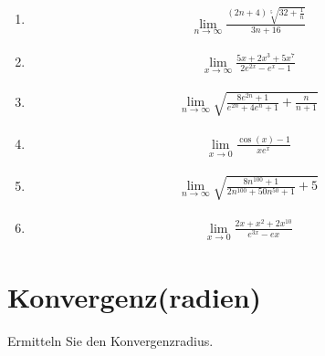 \documentclass{article}
\begin{document}
\begin{multicols}{2}
\begin{enumerate}
    \item \begin{align*}
        \lim_{n \to \infty} \frac{(2n + 4)\sqrt[5]{32 + \frac{1}{n}}}{3n + 16}
    \end{align*}

    \item \begin{align*}
        \lim_{x \to \infty} \frac{5x + 2x^3 + 5x^7}{2e^{2x} - e^x - 1}
    \end{align*}

    \item \begin{align*}
        \lim_{n \to \infty} \sqrt{\frac{8e^{2n} + 1}{e^{2n} + 4e^n + 1} + \frac{n}{n + 1}}
    \end{align*}

    \item \begin{align*}
        \lim_{x \to 0} \frac{\cos(x) - 1}{xe^x}
    \end{align*}

    \item \begin{align*}
        \lim_{n \to \infty} \sqrt{\frac{8n^{100} + 1}{2n^{100} + 50n^{50} + 1} + 5}
    \end{align*}

    \item \begin{align*}
        \lim_{x \to 0} \frac{2x + x^2 + 2x^{10}}{e^{3x} - e{x}}
    \end{align*}
\end{enumerate}
\end{multicols}

\section*{Konvergenz(radien)}

Ermitteln Sie den Konvergenzradius.
\end{document}
